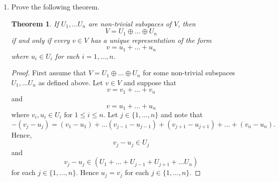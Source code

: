 \documentclass[12pt,letterpaper]{article}
\theoremstyle{plain}
\newtheorem{theorem}{Theorem}[section]
\theoremstyle{definition}
\begin{document}
\begin{enumerate}[1.]
\hrule
\item Prove the following theorem. \\
\begin{theorem} If $U_1, \ldots U_n$ are non-trivial subspaces of $V$, then 
\[V=U_1\oplus \ldots \oplus U_n\] if and only if every $v\in V$ has a unique representation of the form 
\[v=u_1+\ldots +u_n\] 
where $u_i\in U_i$ for each $i=1,\ldots, n$. 
\end{theorem}
\begin{proof} First assume that $V=U_1\oplus \ldots \oplus U_n$ for some non-trivial subspaces $U_1, \ldots U_n$ as defined above. Let $v\in V$ and suppose that 
\[v=v_1+\ldots +v_n\]
and 
\[v=u_1+\ldots +u_n\]
where $v_i, u_i\in U_i$ for $1\leq i\leq n$. Let $j\in \{1, \ldots ,n\}$ and note that 
\[-(v_j-u_j)=(v_1-u_1)+\ldots (v_{j-1}-u_{j-1})+(v_{j+1}-u_{j+1})+\ldots +(v_n-u_n).\]
Hence, 
\[v_j-u_j\in U_j\]
and 
\[v_j-u_j\in (U_1+\ldots +U_{j-1}+U_{j+1}+\ldots U_n)\]
for each $j\in \{1,\ldots ,n\}$. 
Hence $u_j=v_j$ for each $j\in \{1,\ldots, n\}$. 


\end{proof}
\end{enumerate}
\end{document}
